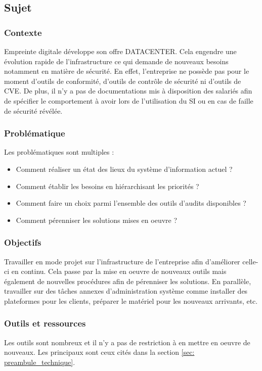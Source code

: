 \documentclass[12pt]{article}
\begin{document}
\subsection{Sujet}
\subsubsection{Contexte}
Empreinte digitale développe son offre DATACENTER. 
Cela engendre une évolution rapide de l'infrastructure ce qui demande de nouveaux besoins notamment en matière de sécurité. 
En effet, l'entreprise ne possède pas pour le moment d'outils de conformité, d'outils de contrôle de sécurité ni d'outils de \gls{CVE}. 
De plus, il n'y a pas de documentations mis à disposition des salariés afin de spécifier le comportement à avoir lors de l'utilisation du SI ou en cas de faille de sécurité révélée.

\subsubsection{Problématique}
Les problématiques sont multiples :
\begin{itemize}
    \item Comment réaliser un état des lieux du système d'information actuel ?
    \item Comment établir les besoins en hiérarchisant les priorités ?
    \item Comment faire un choix parmi l'ensemble des outils d'audits disponibles ?
    \item Comment pérenniser les solutions mises en oeuvre ? 
\end{itemize}

\subsubsection{Objectifs}
Travailler en mode projet sur l'infrastructure de l'entreprise afin d'améliorer celle-ci en continu. 
Cela passe par la mise en oeuvre de nouveaux outils mais également de nouvelles procédures afin de pérenniser les solutions. 
En parallèle, travailler sur des tâches annexes d'administration système comme installer des plateformes pour les clients, préparer le matériel pour les nouveaux arrivants, etc.

\subsubsection{Outils et ressources}
Les outils sont nombreux et il n'y a pas de restriction à en mettre en oeuvre de nouveaux. 
Les principaux sont ceux cités dans la section \ref{sec: preambule_technique}.
\end{document}
